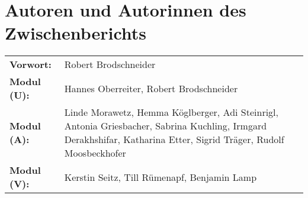 {}
\section*{Autoren und Autorinnen des Zwischenberichts}
\label{cha:authoren}

\vspace{20mm}


\begin{tabularx}{\textwidth}{l X} 

    \textbf{Vorwort:} &
    Robert Brodschneider \\

    \textbf{Modul (U):} &
    Hannes Oberreiter, Robert Brodschneider \\

    \textbf{Modul (A):} &
    Linde Morawetz, Hemma Köglberger, Adi Steinrigl, \newline
    Antonia Griesbacher, Sabrina Kuchling, Irmgard Derakhshifar, Katharina Etter,
    Sigrid Träger, Rudolf Moosbeckhofer \\

    \textbf{Modul (V):} &
    Kerstin Seitz, Till Rümenapf, Benjamin Lamp \\

\end{tabularx}


